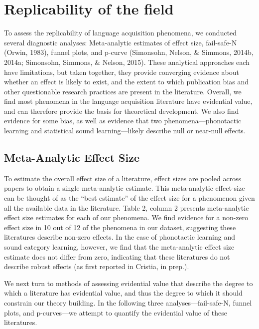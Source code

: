 \documentclass[9pt,twocolumn,twoside,lineno]{pnas-new}
\begin{document}
\section*{Replicability of the field}\label{replicability-of-the-field}

To assess the replicability of language acquisition phenomena, we
conducted several diagnostic analyses: Meta-analytic estimates of effect
size, fail-safe-N (Orwin, 1983), funnel plots, and p-curve (Simonsohn,
Nelson, \& Simmons, 2014b, 2014a; Simonsohn, Simmons, \& Nelson, 2015).
These analytical approaches each have limitations, but taken together,
they provide converging evidence about whether an effect is likely to
exist, and the extent to which publication bias and other questionable
research practices are present in the literature. Overall, we find most
phenomena in the language acquisition literature have evidential value,
and can therefore provide the basis for theoretical development. We also
find evidence for some bias, as well as evidence that two
phenomena---phonotactic learning and statistical sound learning---likely
describe null or near-null effects.




\subsection*{Meta-Analytic Effect Size}\label{meta-analytic-effect-size}

To estimate the overall effect size of a literature, effect sizes are
pooled across papers to obtain a single meta-analytic estimate. This
meta-analytic effect-size can be thought of as the \enquote{best
estimate} of the effect size for a phenomenon given all the available
data in the literature. Table 2, column 2 presents meta-analytic effect
size estimates for each of our phenomena. We find evidence for a
non-zero effect size in 10 out of 12 of the phenomena in our dataset,
suggesting these literatures describe non-zero effects. In the case of
phonotactic learning and sound category learning, however, we find that
the meta-analytic effect size estimate does not differ from zero,
indicating that these literatures do not describe robust effects (as
first reported in Cristia, in prep.).

We next turn to methods of assessing evidential value that describe the
degree to which a literature has evidential value, and thus the degree
to which it should constrain our theory building. In the following three
analyses---fail-safe-N, funnel plots, and p-curves---we attempt to
quantify the evidential value of these literatures.
\end{document}
